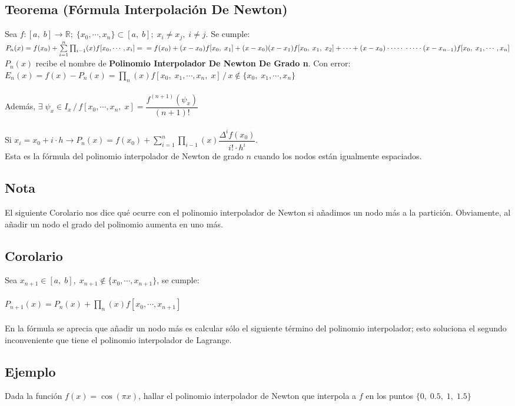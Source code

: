 \documentclass[12pt,a4paper,oneside]{scrbook}
\begin{document}
\subsection*{Teorema (Fórmula Interpolación De Newton)}
Sea $f:[a,\; b]\longrightarrow\mathbb{R};\;\{ x_0,\cdots ,x_n\}\subset [a,\; b];\; x_i\neq x_j,\;i\neq j$. Se cumple:\\
$
P_n(x)=f(x_0)+\sum\limits_{i=1}^n \prod_{i-1}(x)f[x_0,\cdots ,x_i]=\\
=f(x_0)+(x-x_0)f[x_0,\;x_1]+(x-x_0)(x-x_1)f[x_0,\; x_1,\; x_2]+\cdots +(x-x_0)\cdot\cdots\cdot\\\cdot\cdots\cdot (x-x_{n-1})f[x_0,\;x_1,\cdots ,x_n]
$\\
$P_n(x)$ recibe el nombre de \textbf{Polinomio Interpolador De Newton De Grado n}. Con error:\\
$
E_n(x)=f(x)-P_n(x)=\prod_n (x)f[x_0,\;x_1,\cdots , x_n,\; x]\,/\,x\notin \{ x_0,\;x_1,\cdots ,x_n \}
$\\ \\
Además, $\exists\;\psi_x\in I_x\,/\, f[x_0,\cdots ,x_n,\; x]=\dfrac{f^{(n+1)}(\psi_x)}{(n+1)!}$\\ \\
Si $x_i = x_0 + i\cdot h\longrightarrow P_n(x)=f(x_0)+\sum\limits _{i=1}^n \prod_{i-1} (x)\dfrac{\Delta^i f(x_0)}{i!\cdot h^i}$.\\
Esta es la fórmula del polinomio interpolador de Newton de grado $n$ cuando los nodos están igualmente espaciados.
\subsection*{Nota}
El siguiente Corolario nos dice qué ocurre con el polinomio interpolador de Newton si añadimos un nodo más a la partición. Obviamente, al añadir un nodo el grado del polinomio aumenta en uno más.\newpage
\subsection*{Corolario}
Sea $x_{n+1}\in [a,\; b],\; x_{n+1}\notin \{x_0,\cdots ,x_{n+1} \}$, se cumple:\\ \\
$
P_{n+1}(x) = P_n(x) + \prod_n (x)f[x_0,\cdots ,x_{n+1}]
$\\ \\
En la fórmula se aprecia que añadir un nodo más es calcular sólo el siguiente término del polinomio interpolador; esto soluciona el segundo inconveniente que tiene el polinomio interpolador de Lagrange.
\subsection*{Ejemplo}
Dada la función $f(x)=\cos (\pi x)$, hallar el polinomio interpolador de Newton que interpola a $f$ en los puntos $\{ 0,\;0.5,\; 1,\; 1.5 \}$
\end{document}
